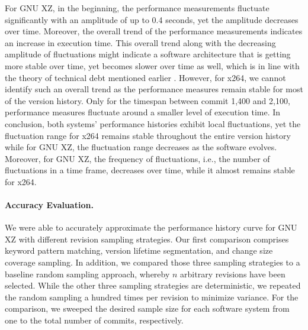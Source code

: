 For GNU XZ, in the beginning, the performance measurements fluctuate
significantly with an amplitude of up to 0.4 seconds, yet the amplitude
decreases over time. Moreover, the overall trend of the performance
measurements indicates an increase in execution time. This overall trend along
with the decreasing amplitude of fluctuations might indicate a software
architecture that is getting more stable over time, yet becomes slower over
time as well, which is in line with the theory of technical debt mentioned
earlier \citep{guo_tracking_2011}. However, for x264, we cannot identify such an
overall trend as the performance measures remain stable for most of the version
history. Only for the timespan between commit 1,400 and 2,100, performance
measures fluctuate around a smaller level of execution time. In conclusion,
both systems’ performance histories exhibit local fluctuations, yet the
fluctuation range for x264 remains stable throughout the entire version history
while for GNU XZ, the fluctuation range decreases as the software evolves.
Moreover, for GNU XZ, the frequency of fluctuations, i.e., the number of
fluctuations in a time frame, decreases over time, while it almost remains
stable for x264.

\paragraph{Accuracy Evaluation.} We were able to accurately approximate the
performance history curve for GNU XZ with different revision sampling
strategies. Our first comparison comprises keyword pattern matching, version
lifetime segmentation, and change size coverage sampling. In addition, we
compared those three sampling strategies to a baseline random sampling
approach, whereby $n$ arbitrary revisions have been selected. While the other
three sampling strategies are deterministic, we repeated the random sampling a
hundred times per revision to minimize variance. For the comparison, we sweeped
the desired sample size for each software system from one to the total number
of commits, respectively.

